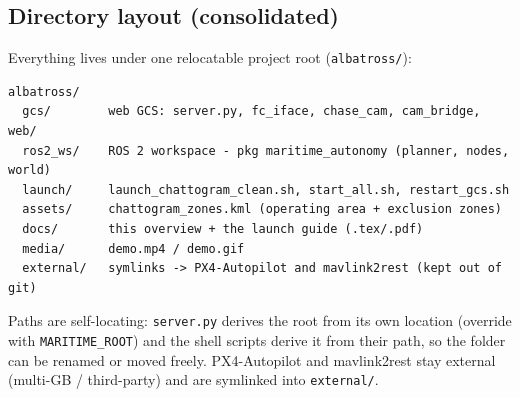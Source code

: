 \documentclass[11pt]{article}
\begin{document}
\subsection{Directory layout (consolidated)}
Everything lives under one relocatable project root (\texttt{albatross/}):
\begin{lstlisting}
albatross/
  gcs/        web GCS: server.py, fc_iface, chase_cam, cam_bridge, web/
  ros2_ws/    ROS 2 workspace - pkg maritime_autonomy (planner, nodes, world)
  launch/     launch_chattogram_clean.sh, start_all.sh, restart_gcs.sh
  assets/     chattogram_zones.kml (operating area + exclusion zones)
  docs/       this overview + the launch guide (.tex/.pdf)
  media/      demo.mp4 / demo.gif
  external/   symlinks -> PX4-Autopilot and mavlink2rest (kept out of git)
\end{lstlisting}
Paths are self-locating: \texttt{server.py} derives the root from its own location
(override with \texttt{MARITIME\_ROOT}) and the shell scripts derive it from their
path, so the folder can be renamed or moved freely. PX4-Autopilot and mavlink2rest
stay external (multi-GB / third-party) and are symlinked into \texttt{external/}.
\end{document}
